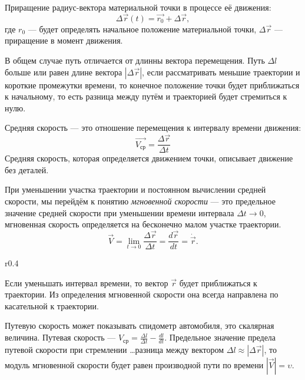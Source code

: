 \documentclass[10pt]{extbook}
\begin{document}
Приращение радиус-вектора материальной точки в процессе её движения: \[
	\Delta \vec{r}(t) = \vec{r_0} + \Delta \vec{r}
	,\] где \( r_0 \) --- будет определять начальное положение материальной точки,
\( \Delta \vec{r} \) --- приращение в момент движения.

В общем случае путь отличается от длинны вектора перемещения. Путь \( \Delta l
\) больше или равен длине вектора \( |\Delta \vec{r}| \), если рассматривать
меньшие траектории и короткие промежутки времени, то конечное положение точки
будет приближаться к начальному, то есть разница между путём и траекторией
будет стремиться к нулю.

Средняя скорость --- это отношение перемещения к интервалу времени движения:
\begin{equation}
	\vec{V_\text{ср}} = \frac{\Delta \vec{r}}{\Delta t}
\end{equation}
Средняя скорость, которая определяется движением точки, описывает движение без
деталей.

При уменьшении участка траектории и постоянном вычислении средней скорости, мы
перейдём к понятию \emph{мгновенной скорости} --- это предельное значение
средней скорости при уменьшении времени интервала \( \Delta t \to 0 \),
мгновенная скорость определяется на бесконечно малом участке траектории.
\[
	\vec{V} = \lim_{t \to 0} \frac{\Delta \vec{r}}{\Delta t} = \frac{d \vec{r}}{d
		t} = \dot{\vec{r}}
	.\]

\begin{wrapfigure}{r}{0.4\textwidth}
	\begin{center}
	\end{center}
\end{wrapfigure}

Если уменьшать интервал времени, то вектор \( \vec{r} \) будет приближаться к
траектории. Из определения мгновенной скорости она всегда направлена по
касательной к траектории.

Путевую скорость может показывать спидометр
автомобиля, это скалярная величина. Путевая скорость --- \( V_\text{ср} =
\frac{\Delta l}{\Delta t} - \frac{d l}{d t} \). Предельное значение предела
путевой скорости при стремлении \ldots разница между вектором \( \Delta l
\approx |\Delta \vec{r}| \), то модуль мгновенной скорости будет равен
производной пути по времени \( |\vec{V}| = \upsilon \).
\end{document}
